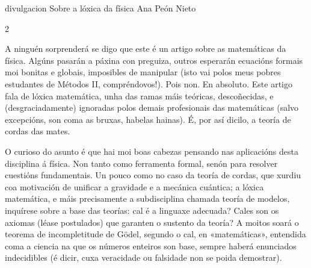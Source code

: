 \Artigo%
{divulgacion}%
{Sobre a lóxica da física}%
{Ana Peón Nieto}%
{}%

\begin{multicols}{2}

A ninguén sorprenderá se digo que este é un artigo sobre as matemáticas da
física. Algúns pasarán a páxina con preguiza, outros esperarán ecuacións
formais moi bonitas e globais, imposibles de manipular (isto vai polos meus
pobres estudantes de Métodos II,  compréndovos!). Pois non. En absoluto. Este
artigo fala de lóxica matemática, unha das ramas máis teóricas, descoñecidas, e
(desgraciadamente) ignoradas polos demais profesionais das matemáticas (salvo
excepcións, son coma as bruxas, habelas hainas). É, por así dicilo, a teoría de
cordas das mates.

O curioso do asunto é que hai moi boas cabezas pensando nas aplicacións desta
disciplina á física. Non tanto como ferramenta formal, senón para resolver
cuestións fundamentais. Un pouco como no caso da teoría de cordas, que xurdiu
coa motivación de unificar a gravidade e a mecánica cuántica; a lóxica
matemática, e máis precisamente a subdisciplina chamada teoría de modelos,
inquírese sobre a base das teorías: cal é a linguaxe adecuada? Cales son os
axiomas (léase postulados) que garanten o sustento da teoría? A moitos soará o
teorema de incompletitude de Gödel, segundo o cal, en «matemáticas», entendida
coma a ciencia na que os números enteiros son base, sempre haberá enunciados
indecidibles (é dicir, cuxa veracidade ou falsidade non se poida demostrar).


\end{multicols}
